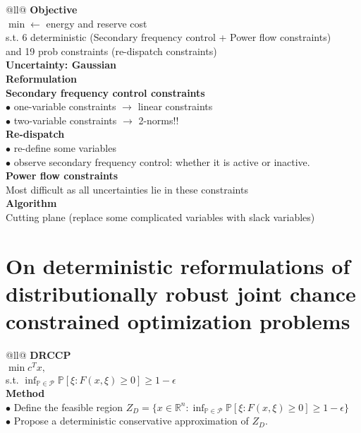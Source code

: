 \documentclass[11pt, oneside, reqno]{amsbook}
\begin{document}
\begin{longtblr}[caption={Summary of Model of \cite{li2023}}]{@{}ll@{}}
  \hline\hline
  { \bfseries Objective} \\
  $\min \leftarrow$ energy and reserve cost \\
  s.t. 6 deterministic (Secondary frequency control + Power flow constraints) \\
  and 19 prob constraints (re-dispatch constraints) \\
  \hline\hline
  { \bfseries Uncertainty: Gaussian} \\
  \hline \hline
  { \bfseries Reformulation} \\
  \hline
  { \bfseries Secondary frequency control constraints} \\
  $\bullet$ one-variable constraints $\rightarrow$ linear constraints \\
  $\bullet$ two-variable constraints $\rightarrow$ {\color{red} 2-norms!!} \\
  { \bfseries Re-dispatch} \\
  $\bullet$ re-define some variables \\
  $\bullet$ observe secondary frequency control: whether it is active or inactive. \\
  { \bfseries Power flow constraints} \\
  Most difficult as all uncertainties lie in these constraints\\
  \hline \hline
  { \bfseries Algorithm} \\
  Cutting plane (replace some complicated variables with slack variables)
\end{longtblr}

\chapter{On deterministic reformulations of distributionally robust joint chance constrained optimization problems}

\begin{longtblr}[caption={Summary of Model of \cite{xie2017deterministic}}]{@{}ll@{}}
  \hline\hline
  { \bfseries DRCCP} \\
  $\min c^T x ,$ \\
  s.t. $\inf_{\mathbb{P} \in \mathcal{P}} \mathbb{P} [ \xi: F(x, \xi) \ge 0] \ge 1 - \epsilon$ \\
  \hline\hline
  { \bfseries Method} \\
  $\bullet$ Define the feasible region $Z_D = \{ x \in \mathbb{R}^n: \inf_{\mathbb{P} \in \mathcal{P}} \mathbb{P} [\xi: F(x, \xi) \ge 0] \ge 1 - \epsilon \}$ \\
  $\bullet$ Propose a deterministic conservative approximation of $Z_D$. \\
  \\ \hline \hline
\end{longtblr}
\end{document}
